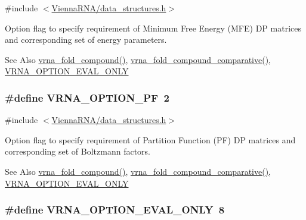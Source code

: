 {\ttfamily \#include $<$\hyperlink{data__structures_8h}{Vienna\-R\-N\-A/data\-\_\-structures.\-h}$>$}



Option flag to specify requirement of Minimum Free Energy (M\-F\-E) D\-P matrices and corresponding set of energy parameters. 

\begin{DoxySeeAlso}{See Also}
\hyperlink{group__fold__compound_ga6601d994ba32b11511b36f68b08403be}{vrna\-\_\-fold\-\_\-compound()}, \hyperlink{group__fold__compound_gad6bacc816af274922b13d947f708aa0c}{vrna\-\_\-fold\-\_\-compound\-\_\-comparative()}, \hyperlink{group__fold__compound_ga61469c423131552c8483229f8b6c7e0e}{V\-R\-N\-A\-\_\-\-O\-P\-T\-I\-O\-N\-\_\-\-E\-V\-A\-L\-\_\-\-O\-N\-L\-Y} 
\end{DoxySeeAlso}
\hypertarget{group__fold__compound_gabfbadcddda3e74ce7f49035ef8f058f7}{
\subsubsection[{V\-R\-N\-A\-\_\-\-O\-P\-T\-I\-O\-N\-\_\-\-P\-F}]{\setlength{\rightskip}{0pt plus 5cm}\#define V\-R\-N\-A\-\_\-\-O\-P\-T\-I\-O\-N\-\_\-\-P\-F~2}}\label{group__fold__compound_gabfbadcddda3e74ce7f49035ef8f058f7}


{\ttfamily \#include $<$\hyperlink{data__structures_8h}{Vienna\-R\-N\-A/data\-\_\-structures.\-h}$>$}



Option flag to specify requirement of Partition Function (P\-F) D\-P matrices and corresponding set of Boltzmann factors. 

\begin{DoxySeeAlso}{See Also}
\hyperlink{group__fold__compound_ga6601d994ba32b11511b36f68b08403be}{vrna\-\_\-fold\-\_\-compound()}, \hyperlink{group__fold__compound_gad6bacc816af274922b13d947f708aa0c}{vrna\-\_\-fold\-\_\-compound\-\_\-comparative()}, \hyperlink{group__fold__compound_ga61469c423131552c8483229f8b6c7e0e}{V\-R\-N\-A\-\_\-\-O\-P\-T\-I\-O\-N\-\_\-\-E\-V\-A\-L\-\_\-\-O\-N\-L\-Y} 
\end{DoxySeeAlso}
\hypertarget{group__fold__compound_ga61469c423131552c8483229f8b6c7e0e}{
\subsubsection[{V\-R\-N\-A\-\_\-\-O\-P\-T\-I\-O\-N\-\_\-\-E\-V\-A\-L\-\_\-\-O\-N\-L\-Y}]{\setlength{\rightskip}{0pt plus 5cm}\#define V\-R\-N\-A\-\_\-\-O\-P\-T\-I\-O\-N\-\_\-\-E\-V\-A\-L\-\_\-\-O\-N\-L\-Y~8}}\label{group__fold__compound_ga61469c423131552c8483229f8b6c7e0e}


